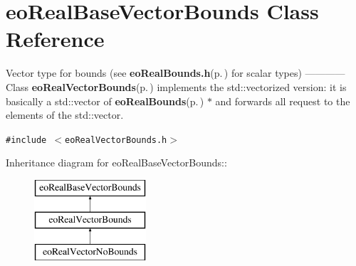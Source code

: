 \section{eo\-Real\-Base\-Vector\-Bounds Class Reference}
\label{classeo_real_base_vector_bounds}
Vector type for bounds (see {\bf eo\-Real\-Bounds.h}{\rm (p.\,\pageref{eo_real_bounds_8h})} for scalar types) ------------ Class {\bf eo\-Real\-Vector\-Bounds}{\rm (p.\,\pageref{classeo_real_vector_bounds})} implements the std::vectorized version: it is basically a std::vector of {\bf eo\-Real\-Bounds}{\rm (p.\,\pageref{classeo_real_bounds})} $\ast$ and forwards all request to the elements of the std::vector.  


{\tt \#include $<$eo\-Real\-Vector\-Bounds.h$>$}

Inheritance diagram for eo\-Real\-Base\-Vector\-Bounds::\begin{figure}[H]
\begin{center}
\leavevmode
\includegraphics[height=3cm]{classeo_real_base_vector_bounds}
\end{center}
\end{figure}
